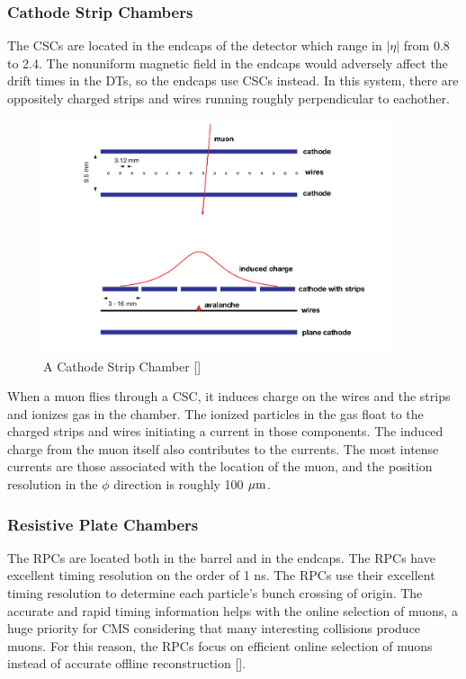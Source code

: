 \FloatBarrier
\subsubsection{Cathode Strip Chambers}

The CSCs are located in the endcaps of the detector which range in $|\eta|$ from 0.8 to 2.4. The nonuniform magnetic field in the endcaps would adversely affect the drift times in the DTs, so the endcaps use CSCs instead. In this system, there are oppositely charged strips and wires running roughly perpendicular to eachother.

\begin{figure}[h!]
  \centering
  \includegraphics[width=4in]{images/CSC.png}
  \caption
   {A Cathode Strip Chamber [\cite{mutdr}]}
  \label{fig:csc}
\end{figure}
When a muon flies through a CSC, it induces charge on the wires and the strips and ionizes gas in the chamber. The ionized particles in the gas float to the charged strips and wires initiating a current in those components. The induced charge from the muon itself also contributes to the currents. The most intense currents are those associated with the location of the muon, and the position resolution in the $\phi$ direction is roughly 100 ${\rm \mu m}$.

\FloatBarrier
\subsubsection{Resistive Plate Chambers}

The RPCs are located both in the barrel and in the endcaps. The RPCs have excellent timing resolution on the order of 1 ns. The RPCs use their excellent timing resolution to determine each particle's bunch crossing of origin. The accurate and rapid timing information helps with the online selection of muons, a huge priority for CMS considering that many interesting collisions produce muons. For this reason, the RPCs focus on efficient online selection of muons instead of accurate offline reconstruction [\cite{cmsexp}].

